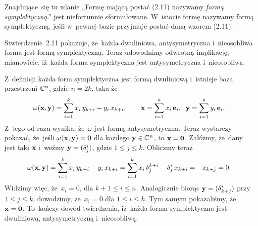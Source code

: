 \documentclass[a4paper,11pt]{article}
\begin{document}
\vspace{\spaceFour}





 Znajdujące~się tu zdanie „Formę mającą postać (2.11)
nazywamy \textit{formą symplektyczną}.” jest niefortunnie sformułowane.
W~istocie formę nazywamy formą symplektyczną, jeśli w~pewnej bazie
przyjmuje postać daną wzorem (2.11).

Stwierdzenie~2.11 pokazuje, że~każda dwuliniowa, antysymetryczna
i~nieosobliwa forma jest formą symplektyczną. Teraz udowodnimy odwrotną
implikację, mianowicie, iż~każda forma symplektyczna jest antysymetryczna
i~nieosobliwa.

Z~definicji każda form symplektyczna jest formą dwuliniową i~istnieje baza
przestrzeni $\mathbb{C}^{ n }$, gdzie $n = 2k$, taka że
\begin{equation}
  \label{eq:Wojtynski-26}
  \omega( \mathbf{x}, \mathbf{y} ) =
  \sum_{ i = 1 }^{ k } x_{ i } \, y_{ k + i } - y_{ i } \, x_{ k + i }, \qquad
  \mathbf{x} = \sum_{ i = 1 }^{ n } x_{ i } \, \mathbf{e}_{ i }, \;\;
  \mathbf{y} = \sum_{ i = 1 }^{ n } y_{ i } \, \mathbf{e}_{ i }.
\end{equation}
Z~tego od razu wynika, że~$\omega$ jest formą antysymetryczna. Teraz wystarczy
pokazać, że~jeśli $\omega( \mathbf{x}, \mathbf{y} ) = 0$ dla każdego
$\mathbf{y} \in \mathbb{C}^{ n }$, to $\mathbf{x} = \mathbf{0}$. Załóżmy, że~dany
jest taki $\mathbf{x}$ i~weźmy $\mathbf{y} = ( \delta^{ i }_{ j } )$, gdzie
$1 \leq j \leq k$. Obliczmy teraz
\begin{equation}
  \label{eq:Wojtynski-27}
  \omega( \mathbf{x}, \mathbf{y} ) =
  \sum_{ i = 1 }^{ k } x_{ i } \, y_{ k + i } - y_{ i } \, x_{ k + i } =
  \sum_{ i = 1 }^{ k } x_{ i } \, \delta^{ k + i }_{ j } - \delta^{ i }_{ j } \, x_{ k + i } =
  -x_{ k + j } = 0.
\end{equation}
Widzimy więc, że~$x_{ i } = 0$, dla $k + 1 \leq i \leq n$. Analogicznie biorąc
$\mathbf{y} = ( \delta^{ i }_{ k + j } )$ przy $1 \leq j \leq k$, dowodzimy,
że~$x_{ i } = 0$ dla $1 \leq i \leq k$. Tym samym pokazaliśmy,
że~$\mathbf{x} = \mathbf{0}$. To~kończy dowód twierdzenia, iż~każda forma
symplektyczna jest dwuliniową, antysymetryczną i~nieosobliwą.

\vspace{\spaceFour}
\end{document}
